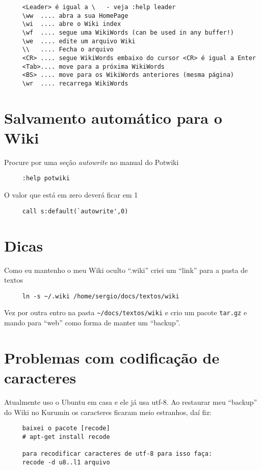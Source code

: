 \begin{verbatim}
     <Leader> é igual a \   - veja :help leader
     \ww  .... abra a sua HomePage
     \wi  .... abre o Wiki index
     \wf  .... segue uma WikiWords (can be used in any buffer!)
     \we  .... edite um arquivo Wiki
     \\   .... Fecha o arquivo
     <CR> .... segue WikiWords embaixo do cursor <CR> é igual a Enter
     <Tab>.... move para a próxima WikiWords
     <BS> .... move para os WikiWords anteriores (mesma página)
     \wr  .... recarrega WikiWords
\end{verbatim}

\section{Salvamento automático para o Wiki }
\label{Salvamento automático para o Wiki }
Procure por uma seção {\em autowrite} no manual do Potwiki

\begin{verbatim}
     :help potwiki
\end{verbatim}

O valor que está em zero deverá ficar em 1

\begin{verbatim}
     call s:default(`autowrite',0)
\end{verbatim}

\section{Dicas}
Como eu mantenho o meu Wiki oculto ``.wiki'' criei um ``link'' para a pasta de textos

\begin{verbatim}
     ln -s ~/.wiki /home/sergio/docs/textos/wiki
\end{verbatim}

Vez por outra entro na pasta \verb|~/docs/textos/wiki| e crio um
pacote {\tt tar.gz} e mando para ``web'' como forma de manter um ``backup''.

\section{Problemas com codificação de caracteres}
\label{Problemas com codificação de caracteres}

Atualmente uso o Ubuntu em casa e ele já usa utf-8. Ao restaurar meu
``backup'' do Wiki no Kurumin os caracteres ficaram meio estranhos,
daí fiz:

\begin{verbatim}
     baixei o pacote [recode]
     # apt-get install recode
     
     para recodificar caracteres de utf-8 para isso faça:
     recode -d u8..l1 arquivo
\end{verbatim}
